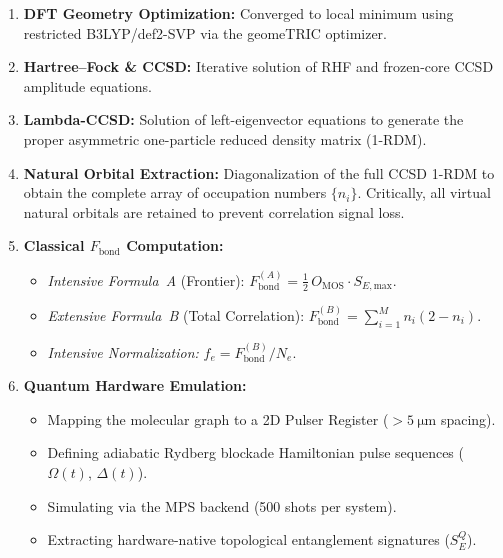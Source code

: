 \documentclass[12pt,a4paper]{article}
\begin{document}
\begin{enumerate}
  \item \textbf{DFT Geometry Optimization:}
    Converged to local minimum using restricted B3LYP/def2-SVP via
    the geomeTRIC optimizer.

  \item \textbf{Hartree--Fock \& CCSD:}
    Iterative solution of RHF and frozen-core CCSD amplitude equations.

  \item \textbf{Lambda-CCSD:}
    Solution of left-eigenvector equations to generate the proper
    asymmetric one-particle reduced density matrix (1-RDM).

  \item \textbf{Natural Orbital Extraction:}
    Diagonalization of the full CCSD 1-RDM to obtain the complete
    array of occupation numbers $\{n_i\}$. Critically, all virtual
    natural orbitals are retained to prevent correlation signal loss.

  \item \textbf{Classical $F_{\text{bond}}$ Computation:}
    \begin{itemize}
      \item \emph{Intensive Formula~A} (Frontier):
        $F_{\text{bond}}^{(A)} = \tfrac{1}{2}\, O_{\text{MOS}}
        \cdot S_{E,\text{max}}$.
      \item \emph{Extensive Formula~B} (Total Correlation):
        $F_{\text{bond}}^{(B)} = \sum_{i=1}^{M} n_i(2-n_i)$.
      \item \emph{Intensive Normalization:}
        $f_e = F_{\text{bond}}^{(B)} / N_e$.
    \end{itemize}

  \item \textbf{Quantum Hardware Emulation:}
    \begin{itemize}
      \item Mapping the molecular graph to a 2D Pulser Register
        ($> \SI{5}{\micro\meter}$ spacing).
      \item Defining adiabatic Rydberg blockade Hamiltonian pulse
        sequences ($\Omega(t)$, $\Delta(t)$).
      \item Simulating via the MPS backend (500 shots per system).
      \item Extracting hardware-native topological entanglement
        signatures ($S_E^{Q}$).
    \end{itemize}
\end{enumerate}
\end{document}
